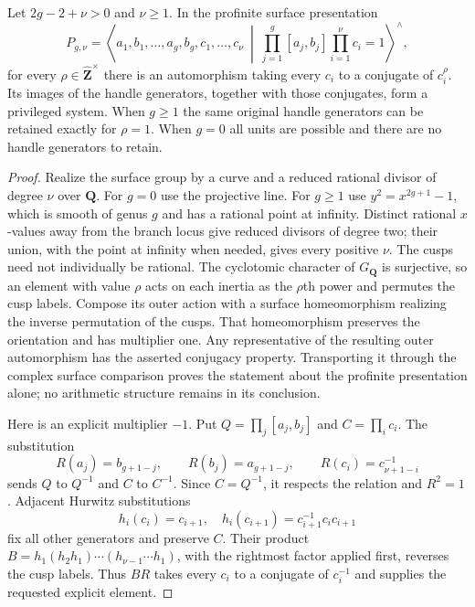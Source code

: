 \begin{proposition}
\label{A:all-multipliers}
Let $2g-2+\nu>0$ and $\nu\ge1$.  In the profinite
surface presentation
\[
 P_{g,\nu}=\left\langle a_1,b_1,\ldots,a_g,b_g,
 c_1,\ldots,c_\nu\ \middle|\
 \prod_{j=1}^g[a_j,b_j]\prod_{i=1}^\nu c_i=1
                          \right\rangle^{\wedge},
\]
for every $\rho\in\widehat{\mathbf Z}^{\times}$
there is an automorphism taking every $c_i$ to a
conjugate of $c_i^\rho$.  Its images of the handle
generators, together with those conjugates, form a
privileged system.  When $g\ge1$ the same original
handle generators can be retained exactly for
$\rho=1$.  When $g=0$ all units are possible and
there are no handle generators to retain.
\end{proposition}
\begin{proof}
Realize the surface group by a curve and a reduced
rational divisor of degree $\nu$ over $\mathbf Q$.
For $g=0$ use the projective line.  For $g\ge1$ use
$y^2=x^{2g+1}-1$, which is smooth of genus $g$ and
has a rational point at infinity.  Distinct rational
$x$-values away from the branch locus give reduced
divisors of degree two; their union, with the point
at infinity when needed, gives every positive $\nu$.
The cusps need not individually be rational.  The
cyclotomic character of $G_{\mathbf Q}$ is surjective,
so an element with value $\rho$ acts on each inertia
as the $\rho$th power and permutes the cusp labels.
Compose its outer action with a surface homeomorphism
realizing the inverse permutation of the cusps.
That homeomorphism preserves the orientation and has
multiplier one.  Any representative of the resulting
outer automorphism has the asserted conjugacy property.
Transporting it through the complex surface comparison
proves the statement about the profinite presentation
alone; no arithmetic structure remains in its conclusion.

Here is an explicit multiplier $-1$.  Put
$Q=\prod_j[a_j,b_j]$ and $C=\prod_i c_i$.  The
substitution
\[
 R(a_j)=b_{g+1-j},\qquad R(b_j)=a_{g+1-j},\qquad
 R(c_i)=c_{\nu+1-i}^{-1}
\]
sends $Q$ to $Q^{-1}$ and $C$ to $C^{-1}$.
Since $C=Q^{-1}$, it respects the relation and
$R^2=1$.  Adjacent Hurwitz substitutions
\[
 h_i(c_i)=c_{i+1},\quad
 h_i(c_{i+1})=c_{i+1}^{-1}c_i c_{i+1}
\]
fix all other generators and preserve $C$.
Their product
$B=h_1(h_2h_1)\cdots(h_{\nu-1}\cdots h_1)$,
with the rightmost factor applied first, reverses
the cusp labels.  Thus $BR$ takes every $c_i$ to
a conjugate of $c_i^{-1}$ and supplies the requested
explicit element.


\end{proof}
